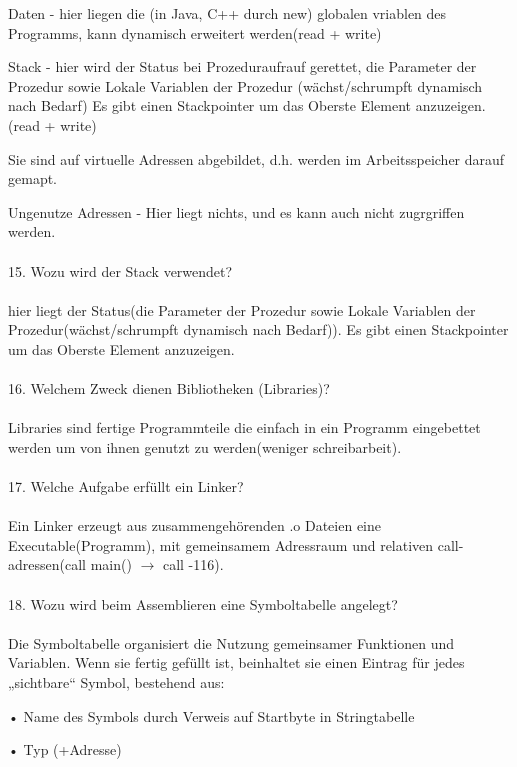 \documentclass{article}
\newcommand\tab[1][1cm]{\hspace*{#1}}
\begin{document}
Daten - hier liegen die (in Java, C++ durch  new) globalen vriablen des Programms, kann dynamisch erweitert werden(read + write)

Stack - hier wird der Status bei Prozeduraufrauf gerettet, die Parameter der Prozedur sowie Lokale Variablen der Prozedur (wächst/schrumpft dynamisch nach Bedarf) Es gibt einen Stackpointer um das Oberste Element anzuzeigen.(read + write)

Sie sind auf virtuelle Adressen abgebildet, d.h. werden im Arbeitsspeicher darauf gemapt.


Ungenutze Adressen - Hier liegt nichts, und es kann auch nicht zugrgriffen werden.
\\
\\
15. Wozu wird der Stack verwendet?
\\
\\
 hier liegt der Status(die Parameter der Prozedur sowie Lokale Variablen der Prozedur(wächst/schrumpft dynamisch nach Bedarf)). Es gibt einen Stackpointer um das Oberste Element anzuzeigen.
\\
\\
16. Welchem Zweck dienen Bibliotheken (Libraries)?
\\
\\
Libraries sind fertige Programmteile die einfach in ein Programm eingebettet werden um von ihnen genutzt zu werden(weniger schreibarbeit).
\\
\\
17. Welche Aufgabe erfüllt ein Linker?
\\
\\
Ein Linker erzeugt aus zusammengeh\"orenden .o Dateien eine Executable(Programm), mit gemeinsamem Adressraum und relativen call-adressen(call main() $\rightarrow$ call -116).
\\
\\
18. Wozu wird beim Assemblieren eine Symboltabelle angelegt?
\\
\\
Die Symboltabelle organisiert die Nutzung gemeinsamer Funktionen und Variablen. Wenn sie fertig gef\"ullt ist, beinhaltet sie einen Eintrag für jedes „sichtbare“ Symbol, bestehend aus:

\tab • Name des Symbols durch Verweis auf Startbyte in Stringtabelle

\tab • Typ (+Adresse)
\end{document}
